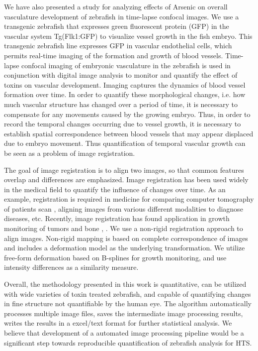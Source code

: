 We have also presented a study for analyzing effects of Arsenic on overall vasculature development of zebrafish in time-lapse confocal images. We use a transgenic zebrafish that expresses green fluorescent protein (GFP) in the vascular system Tg(Flk1:GFP) to visualize vessel growth in the fish embryo. This transgenic zebrafish line expresses GFP in vascular endothelial cells, which permits real-time imaging of the formation and growth of blood vessels. Time-lapse confocal imaging of embryonic vasculature in the zebrafish is used in conjunction with digital image analysis to monitor and quantify the effect of toxins on vascular development. Imaging captures the dynamics of blood vessel formation over time. In order to quantify these morphological changes, i.e. how much vascular structure has changed over a period of time, it is necessary to compensate for any movements caused by the growing embryo. Thus, in order to record the temporal changes occurring due to vessel growth, it is necessary to establish spatial correspondence between blood vessels that may appear displaced due to embryo movement. Thus quantification of temporal vascular growth can be seen as a problem of image registration. 

The goal of image registration is to align two images, so that common features overlap and differences are emphasized. Image registration has been used widely in the medical field to quantify the influence of changes over time. As an example, registration is required in medicine for comparing computer tomography of patients scan \cite{Betke01}, aligning images from various different modalities to diagnose diseases, etc. Recently, image registration has found application in growth monitoring of tumors and bone \cite{Nielsen97}, \cite{Peter03}. We use a non-rigid registration approach to align images. Non-rigid mapping is based on complete correspondence of images and includes a deformation model as the underlying transformation. We utilize free-form deformation based on B-splines for growth monitoring, and use intensity differences as a similarity measure.

Overall, the methodology presented in this work is quantitative, can be utilized with wide varieties of toxin treated zebrafish, and capable of quantifying changes in fine structure not quantifiable by the human eye. The algorithm automatically processes multiple image files, saves the intermediate image processing results, writes the results in a excel/text format for further statistical analysis. We believe that development of a automated image processing pipeline would be a significant step towards reproducible quantification of zebrafish analysis for HTS. 

